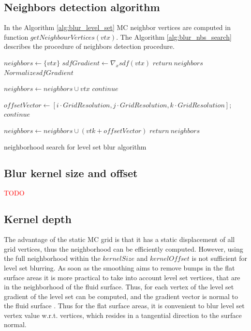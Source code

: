 \subsection{Neighbors detection algorithm}
In the Algorithm \ref{alg:blur_level_set} MC neighbor vertices are computed in function $getNeighbourVertices(vtx)$. The Algorithm \ref{alg:blur_nbs_search} describes the procedure of neighbors detection procedure.
\begin{algorithm}[H]
	\scriptsize
	\begin{algorithmic}
		\State $neighbors \gets \{vtx\}$
		\State $sdfGradient \gets \nabla_x sdf(vtx)$
			\State $return\ neighbors$
		\EndIf
		\State $Normalize sdfGradient$
		
						\State $neighbors \gets neighbors \cup vtx$
						\State $continue$
					\EndIf
					
					\State $offsetVector \gets [i \cdot GridResolution, j \cdot GridResolution, k \cdot GridResolution]$;
						\State $continue$
					\EndIf
					
					\State $neighbors \gets neighbors \cup (vtk + offsetVector)$
				\EndFor
			\EndFor
		\EndFor
		\State $return\ neighbors$
	\end{algorithmic}
	\caption{neighborhood search for level set blur algorithm}
	\label{alg:blur_nbs_search}
\end{algorithm}
\subsection{Blur kernel size and offset}
\textcolor{red}{TODO}

\subsection{Kernel depth}
The advantage of the static MC grid is that it has a static displacement of all grid vertices, thus the neighborhood can be efficiently computed. However, using the full neighborhood within the $kernelSize$ and $kernelOffset$ is not sufficient for level set blurring. As soon as the smoothing aims to remove bumps in the flat surface areas it is more practical to take into account level set vertices, that are in the neighborhood of the fluid surface. Thus, for each vertex of the level set gradient of the level set can be computed, and the gradient vector is normal to the fluid surface \cite{LevelSetMethods}. Thus for the flat surface areas, it is convenient to blur level set vertex value w.r.t. vertices, which resides in a tangential direction to the surface normal.

